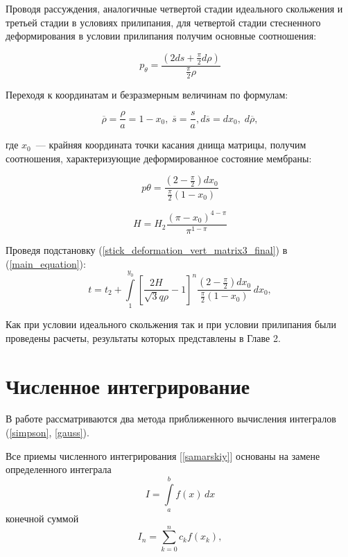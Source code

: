 Проводя рассуждения, аналогичные четвертой стадии идеального скольжения и третьей стадии в условиях прилипания,  для четвертой стадии 
стесненного деформирования в условии прилипания получим основные соотношения:

 \begin{equation}
   p_\theta = \dfrac{(2ds+ \frac{\pi}{2}d\rho)}{\frac{\pi}{2}\rho}
 \end{equation}

Переходя к координатам и безразмерным величинам по формулам:

\begin{equation}
\overline{\rho} = \dfrac{\rho}{a} = 1-x_0, \; \overline{s} = \dfrac{s}{a}, d\overline{s} = dx_0, \; d\overline{\rho},
\end{equation}

где $x_0$~--- крайняя координата точки касания днища матрицы, получим соотношения, характеризующие деформированное состояние мембраны:

 \begin{equation}
   p\theta = \dfrac{(2-\frac{\pi}{2}) dx_0}{\frac{\pi}{2} (1-x_0)}
 \end{equation}
   
 \begin{equation}
   H = H_2 \dfrac{(\pi-x_0)^{4-\pi}}{\pi^{1-\pi}}
 \end{equation}
   
   Проведя подстановку (\ref{stick_deformation_vert_matrix3_final}) в (\ref{main_equation}):
 \begin{equation}
   t = t_2 + \int\limits^{y_0}_1 \left[ \dfrac{2H}{\sqrt3 q \rho} -1\right]^n\dfrac{(2-\frac{\pi}{2}) dx_0}{\frac{\pi}{2} (1-x_0)}\,dx_0,
   \end{equation}

Как при условии идеального скольжения так и при условии прилипания были проведены расчеты, результаты которых представлены в Главе 2.    

\section{Численное интегрирование}
В работе рассматриваются два метода приближенного вычисления интегралов
(\ref{simpson}, \ref{gauss}).

Все приемы численного интегрирования [\ref{samarskiy}] основаны на  замене определенного интеграла 
\begin{equation}
	I = \int\limits_a^b f(x)\,dx
\end{equation}
конечной суммой
\begin{equation}
	I_n = \sum\limits_{k=0}^n c_k f(x_k),
\end{equation}

